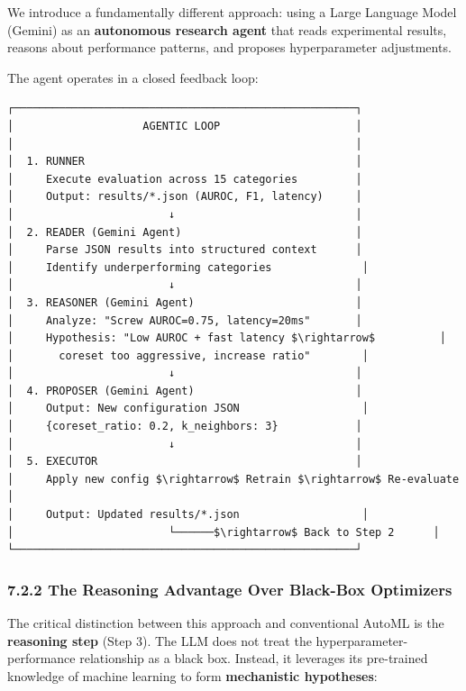 \documentclass[12pt, a4paper, oneside]{report}
\begin{document}
We introduce a fundamentally different approach: using a Large Language Model (Gemini) as an \textbf{autonomous research agent} that reads experimental results, reasons about performance patterns, and proposes hyperparameter adjustments.

The agent operates in a closed feedback loop:

\begin{lstlisting}
┌─────────────────────────────────────────────────────┐
│                    AGENTIC LOOP                     │
│                                                     │
│  1. RUNNER                                          │
│     Execute evaluation across 15 categories         │
│     Output: results/*.json (AUROC, F1, latency)     │
│                        ↓                            │
│  2. READER (Gemini Agent)                           │
│     Parse JSON results into structured context      │
│     Identify underperforming categories              │
│                        ↓                            │
│  3. REASONER (Gemini Agent)                         │
│     Analyze: "Screw AUROC=0.75, latency=20ms"       │
│     Hypothesis: "Low AUROC + fast latency $\rightarrow$          │
│       coreset too aggressive, increase ratio"        │
│                        ↓                            │
│  4. PROPOSER (Gemini Agent)                         │
│     Output: New configuration JSON                   │
│     {coreset_ratio: 0.2, k_neighbors: 3}            │
│                        ↓                            │
│  5. EXECUTOR                                        │
│     Apply new config $\rightarrow$ Retrain $\rightarrow$ Re-evaluate        │
│     Output: Updated results/*.json                   │
│                        └──────$\rightarrow$ Back to Step 2      │
└─────────────────────────────────────────────────────┘
\end{lstlisting}

\subsubsection{7.2.2 The Reasoning Advantage Over Black-Box Optimizers}\label{the-reasoning-advantage-over-black-box-optimizers}

The critical distinction between this approach and conventional AutoML is the \textbf{reasoning step} (Step 3). The LLM does not treat the hyperparameter-performance relationship as a black box. Instead, it leverages its pre-trained knowledge of machine learning to form \textbf{mechanistic hypotheses}:
\end{document}
